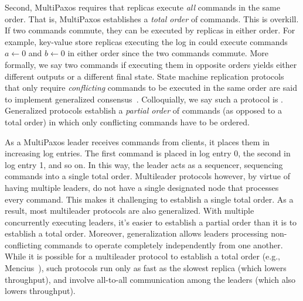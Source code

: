 Second, MultiPaxos requires that replicas execute \emph{all} commands in the
same order. That is, MultiPaxos establishes a \emph{total order} of commands.
This is overkill. If two commands commute, they can be executed by replicas in
either order. For example, key-value store replicas executing the log in
 could execute commands $a \gets 0$ and $b
\gets 0$ in either order since the two commands commute. More formally, we say
two commands  if executing them in opposite orders yields
either different outputs or a different final state. State machine replication
protocols that only require \emph{conflicting} commands to be executed in the
same order are said to implement generalized
consensus~\cite{lamport2005generalized}. Colloquially, we say such a protocol
is . Generalized protocols establish a \emph{partial
order} of commands (as opposed to a total order) in which only conflicting
commands have to be ordered.

As a MultiPaxos leader receives commands from clients, it places them in
increasing log entries. The first command is placed in log entry 0, the second
in log entry 1, and so on. In this way, the leader acts as a sequencer,
sequencing commands into a single total order. Multileader protocols however, by
virtue of having multiple leaders, do not have a single designated node that
processes every command. This makes it challenging to establish a single total
order. As a result, most multileader protocols are also generalized. With
multiple concurrently executing leaders, it's easier to establish a partial
order than it is to establish a total order. Moreover, generalization allows
leaders processing non-conflicting commands to operate completely independently
from one another. While it is possible for a multileader protocol to establish
a total order (e.g., Mencius~\cite{mao2008mencius}), such protocols run only as
fast as the slowest replica (which lowers throughput), and involve all-to-all
communication among the leaders (which also lowers throughput).
